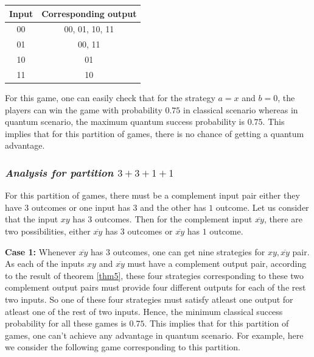 \documentclass[]{svjour3}
\begin{document}
\begin{table}[htbp]
	\begin{center}
		\begin{tabular}{ |c|c| } 
			\hline
			Input & Corresponding output\\
			\hline
			\hline
			00 & 00, 01, 10, 11\\
			\hline
			01 & 00, 11\\
			\hline
			10 & 01\\
			\hline 
			11 & 10\\
			\hline
		\end{tabular}
	\end{center}
	\label{4211}
\end{table}

For this game, one can easily check that for the strategy $a=x$ and $b=0$, the players can win the game with probability $0.75$ in classical scenario whereas in quantum scenario, the maximum quantum success probability is $0.75$. This implies that for this partition of games, there is no chance of getting a quantum advantage.\\	

\subsubsection{\it Analysis for partition $3+3+1+1$}

For this partition of games, there must be a complement input pair either they have $3$ outcomes or one input has $3$ and the other has $1$ outcome. Let us consider that the input $xy$ has $3$ outcomes. Then for the complement input $\overline{xy}$, there are two possibilities, either $\overline{xy}$ has $3$ outcomes or $\overline{xy}$ has $1$ outcome.

\textbf{Case 1:} Whenever $\overline{xy}$ has $3$ outcomes, one can get nine strategies for $xy, \overline{xy}$ pair. As each of the inputs $xy$ and $\overline{xy}$ must have a complement output pair, according to the result of theorem \ref{thm5}, these four strategies corresponding to these two complement output pairs must provide four different outputs for each of the rest two inputs. So one of these four strategies must satisfy atleast one output for atleast one of the rest of two inputs. Hence, the minimum classical success probability for all these games is $0.75$. This implies that for this partition of games, one can't achieve any advantage in quantum scenario. For example, here we consider the following game corresponding to this partition.
\end{document}
